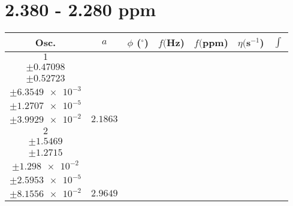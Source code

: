 \documentclass[8pt]{article}
\begin{document}
\section*{2.380 - 2.280 ppm}
\begin{longtable}[l]{c c c c c c c}
\toprule
Osc. & $a$ & $\phi$ ($^{\circ}$) & $f ($Hz) & $f ($ppm) & $\eta ($s$^{-1}$) & $\int$\\
\midrule
$\num{1}$ & \begin{tabular}[c]{@{}c@{}}$\num{51.184}$ \\ $\pm\num{0.47098}$\end{tabular} & \begin{tabular}[c]{@{}c@{}}$\num{1.1676}$ \\ $\pm\num{0.52723}$\end{tabular} & \begin{tabular}[c]{@{}c@{}}$\num{1.1533e+3}$ \\ $\pm\num{6.3549e-3}$\end{tabular} & \begin{tabular}[c]{@{}c@{}}$\num{2.306}$ \\ $\pm\num{1.2707e-5}$\end{tabular} & \begin{tabular}[c]{@{}c@{}}$\num{7.6739}$ \\ $\pm\num{3.9929e-2}$\end{tabular} & $\num{2.1863}$\\
$\num{2}$ & \begin{tabular}[c]{@{}c@{}}$\num{69.706}$ \\ $\pm\num{1.5469}$\end{tabular} & \begin{tabular}[c]{@{}c@{}}$\num{0.88673}$ \\ $\pm\num{1.2715}$\end{tabular} & \begin{tabular}[c]{@{}c@{}}$\num{1.1556e+3}$ \\ $\pm\num{1.298e-2}$\end{tabular} & \begin{tabular}[c]{@{}c@{}}$\num{2.3106}$ \\ $\pm\num{2.5953e-5}$\end{tabular} & \begin{tabular}[c]{@{}c@{}}$\num{7.9588}$ \\ $\pm\num{8.1556e-2}$\end{tabular} & $\num{2.9649}$\\

\end{longtable}
\end{document}
